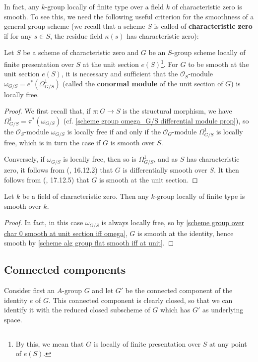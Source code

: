 In fact, any $k$-group locally of finite type over a field $k$ of characteristic zero is smooth. To see this, we need the following useful criterion for the smoothness of a general group scheme (we recall that a scheme $S$ is called of \textbf{characteristic zero} if for any $s\in S$, the residue field $\kappa(s)$ has characteristic zero):

\begin{proposition}\label{scheme group over char 0 smooth at unit section iff omega}
Let $S$ be a scheme of characteristic zero and $G$ be an $S$-group scheme locally of finite presentation over $S$ at the unit section $e(S)$\footnote{By this, we mean that $G$ is locally of finite presentation over $S$ at any point of $e(S)$.}. For $G$ to be smooth at the unit section $e(S)$, it is necessary and sufficient that the $\mathscr{O}_S$-module $\omega_{G/S}=e^*(\Omega_{G/S}^1)$ (called the \textbf{conormal module} of the unit section of $G$) is locally free.
\end{proposition}

\begin{proof}
We first recall that, if $\pi:G\to S$ is the structural morphism, we have $\Omega_{G/S}^1=\pi^*(\omega_{G/S})$ (cf. \cref{scheme group omega_G/S differential module prop}), so the $\mathscr{O}_S$-module $\omega_{G/S}$ is locally free if and only if the $\mathscr{O}_G$-module $\Omega_{G/S}^1$ is locally free, which is in turn the case if $G$ is smooth over $S$.\par
Conversely, if $\omega_{G/S}$ is locally free, then so is $\Omega_{G/S}^1$, and as $S$ has characteristic zero, it follows from (\cite{EGA4-4}, 16.12.2) that $G$ is differentially smooth over $S$. It then follows from (\cite{EGA4-4}, 17.12.5) that $G$ is smooth at the unit section.
\end{proof}

\begin{corollary}\label{scheme alg group smooth over char 0}
Let $k$ be a field of characteristic zero. Then any $k$-group locally of finite type is smooth over $k$.
\end{corollary}
\begin{proof}
In fact, in this case $\omega_{G/S}$ is always locally free, so by \cref{scheme group over char 0 smooth at unit section iff omega}, $G$ is smooth at the identity, hence smooth by \cref{scheme alg group flat smooth iff at unit}.
\end{proof}

\subsection{Connected components}
Consider first an $A$-group $G$ and let $G'$ be the connected component of the identity $e$ of $G$. This connected component is clearly closed, so that we can identify it with the reduced closed subscheme of $G$ which has $G'$ as underlying space.

